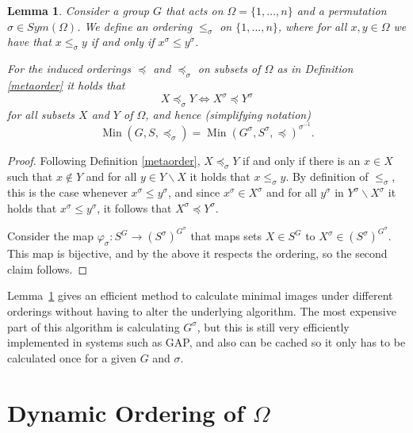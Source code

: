 \documentclass[preprint,12pt]{elsarticle}
\newtheorem{lem}[theorem]{Lemma}
\newcommand{\Sym}[1]{\ensuremath{Sym(#1)}}
\newcommand{\Min}{\operatorname{Min}}
\begin{document}
\begin{lem}\label{lem:map}
  Consider a group \(G\) that acts on $\Omega = \{1,\dots,n\}$ and a
  permutation \(\sigma \in \Sym{\Omega}\). We define an ordering \(\leq_\sigma\) on
  \(\{1,\dots,n\}\), where for all $x,y \in \Omega$ we have that \(x \leq_\sigma y\) if and only if
  \(x^\sigma \leq y^\sigma\).

  For the induced orderings $\preccurlyeq$ and $\preccurlyeq_\sigma$
  on subsets of $\Omega$ as in Definition \ref{metaorder}
  it holds that
  \[ X \preccurlyeq_\sigma  Y \Leftrightarrow X^\sigma \preccurlyeq Y^\sigma \]
  for all subsets $X$ and $Y$ of $\Omega$, and hence (simplifying notation)
  \[\Min(G,S,\preccurlyeq_\sigma) = \Min(G^\sigma,S^\sigma,\preccurlyeq)^{\sigma^{-1}}.\]
\end{lem}

\begin{proof}

  Following Definition \ref{metaorder}, $X \preccurlyeq_\sigma Y$ if and only if
  there is an $x \in X$ such that $x\not\in Y$ and for all
  $y \in Y \backslash X$ it holds that $x \leq_\sigma y$.
  By definition of $\leq_\sigma$, this is the case whenever $x^\sigma \leq y^\sigma$,
  and since $x^\sigma \in X^\sigma$ and for all $y^\sigma$ in $Y^\sigma \backslash X^\sigma$ it
  holds that $x^\sigma \leq y^\sigma$, it follows that $X^\sigma \preccurlyeq Y^\sigma$.

  \medskip

  Consider the map $\varphi_\sigma : S^G \rightarrow (S^\sigma)^{G^\sigma}$ that maps sets
  $X \in S^G$ to $X^\sigma \in (S^\sigma)^{G^\sigma}$. This map is bijective, and by the above it respects the ordering, so the second claim follows.


\end{proof}

Lemma~\ref{lem:map} gives an efficient method to calculate minimal images under
different orderings without having to alter the underlying algorithm. The most
expensive part of this algorithm is calculating \(G^\sigma\), but this is still very
efficiently implemented in systems such as GAP, and also can be cached so it
only has to be calculated once for a given \(G\) and \(\sigma\).



\section{Dynamic Ordering of \(\Omega\)}
\end{document}
